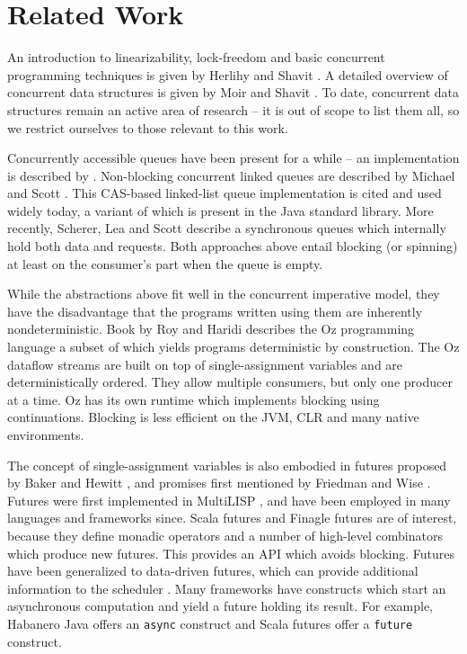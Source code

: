 \documentclass[runningheads,a4paper]{llncs}
\begin{document}
\section{Related Work}

An introduction to linearizability, lock-freedom and basic
concurrent programming techniques is given by Herlihy and Shavit
\cite{Herlihy08}.
A detailed overview of concurrent data structures is given
by Moir and Shavit \cite{Moir05}.
To date, concurrent data structures remain an active area of
research -- it is out of scope to list them all, so we restrict
ourselves to those relevant to this work.

Concurrently accessible queues have been present for a while --
an implementation is described by \cite{Mellor87}.
Non-blocking concurrent linked queues are described by Michael and
Scott \cite{Michael96}. This CAS-based linked-list
queue implementation is cited and used widely today, a variant of
which is present in the Java standard library.
More recently, Scherer, Lea and Scott \cite{SchererLS09} describe a
synchronous queues which internally hold both data and requests.
Both approaches above entail blocking (or spinning) at least on the
consumer's part when the queue is empty.

While the abstractions above fit well in the concurrent imperative
model, they have the disadvantage that the programs written using them
are inherently nondeterministic.
Book by Roy and Haridi \cite{RoyH2004} describes the Oz programming language 
a subset of which yields programs deterministic by construction.
The Oz dataflow streams are built on top of
single-assignment variables and are deterministically ordered.
They allow multiple consumers, but only one producer
at a time.
Oz has its own runtime which implements blocking using
continuations.
Blocking is less efficient on the JVM, CLR and many native
environments.

The concept of single-assignment variables is also embodied in
futures proposed by Baker and Hewitt \cite{Hewitt77}, and promises
first mentioned by Friedman and Wise \cite{Wise76}.
Futures were first implemented in MultiLISP \cite{Halstead85},
and have been employed in many languages and frameworks since.
Scala futures \cite{TODO} and Finagle futures \cite{TODO} are
of interest, because they define monadic operators and a
number of high-level combinators which produce new futures.
This provides an API which avoids blocking.
Futures have been generalized to data-driven futures,
which can provide additional information to the scheduler
\cite{Tasirlar11}.
Many frameworks have constructs which start an asynchronous
computation and yield a future holding its result.
For example, Habanero Java \cite{Shirako11} offers an \verb=async=
construct and Scala futures offer a \verb=future= construct.
\end{document}
